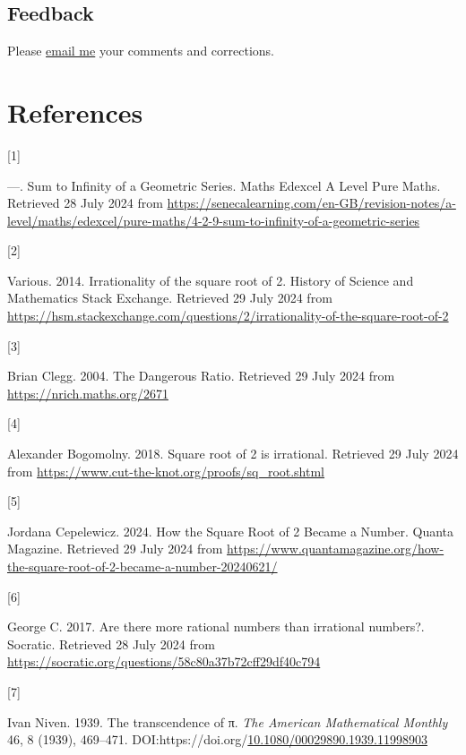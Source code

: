 \documentclass[
  a4paper,
]{article}
\newlength{\cslhangindent}
\newlength{\csllabelwidth}
\newenvironment{CSLReferences}[2] %
 {\begin{list}{}{%
  \setlength{\itemindent}{0pt}
  \setlength{\leftmargin}{0pt}
  \setlength{\parsep}{0pt}
  \ifodd #1
   \setlength{\leftmargin}{\cslhangindent}
   \setlength{\itemindent}{-1\cslhangindent}
  \fi
  \setlength{\itemsep}{#2\baselineskip}}}
 {\end{list}}
\newcommand{\CSLLeftMargin}[1]{\parbox[t]{\csllabelwidth}{\strut#1\strut}}
\newcommand{\CSLRightInline}[1]{\parbox[t]{\linewidth - \csllabelwidth}{\strut#1\strut}}
\begin{document}
\subsection{Feedback}\label{feedback}

Please \href{mailto:feedback.swanlotus@gmail.com}{email me} your
comments and corrections.

\section*{References}\label{bibliography}

\label{refs}
\begin{CSLReferences}{0}{0}
\CSLLeftMargin{{[}1{]} }%
\CSLRightInline{---. {Sum to Infinity of a Geometric Series}. {Maths
Edexcel A Level Pure Maths}. Retrieved 28 July 2024 from
\url{https://senecalearning.com/en-GB/revision-notes/a-level/maths/edexcel/pure-maths/4-2-9-sum-to-infinity-of-a-geometric-series}}

\CSLLeftMargin{{[}2{]} }%
\CSLRightInline{Various. 2014. {Irrationality of the square root of 2}.
{History of Science and Mathematics Stack Exchange}. Retrieved 29 July
2024 from
\url{https://hsm.stackexchange.com/questions/2/irrationality-of-the-square-root-of-2}}

\CSLLeftMargin{{[}3{]} }%
\CSLRightInline{Brian Clegg. 2004. {The Dangerous Ratio}. Retrieved 29
July 2024 from \url{https://nrich.maths.org/2671}}

\CSLLeftMargin{{[}4{]} }%
\CSLRightInline{Alexander Bogomolny. 2018. {Square root of 2 is
irrational}. Retrieved 29 July 2024 from
\url{https://www.cut-the-knot.org/proofs/sq_root.shtml}}

\CSLLeftMargin{{[}5{]} }%
\CSLRightInline{Jordana Cepelewicz. 2024. {How the Square Root of 2
Became a Number}. {Quanta Magazine}. Retrieved 29 July 2024 from
\url{https://www.quantamagazine.org/how-the-square-root-of-2-became-a-number-20240621/}}

\CSLLeftMargin{{[}6{]} }%
\CSLRightInline{George C. 2017. {Are there more rational numbers than
irrational numbers?}. {Socratic}. Retrieved 28 July 2024 from
\url{https://socratic.org/questions/58c80a37b72cff29df40c794}}

\CSLLeftMargin{{[}7{]} }%
\CSLRightInline{Ivan Niven. 1939. The transcendence of π. \emph{{The
American Mathematical Monthly}} 46, 8 (1939), 469--471.
DOI:https://doi.org/\href{https://doi.org/10.1080/00029890.1939.11998903}{10.1080/00029890.1939.11998903}}


\end{CSLReferences}
\end{document}
